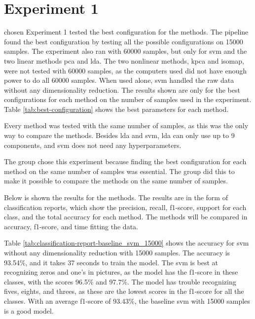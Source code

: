 \section{Experiment 1}\label{sec:experiment-1}chosen
Experiment 1 tested the best configuration for the methods. The pipeline found the best configuration by testing all the possible configurations on 15000 samples. The experiment also ran with 60000 samples, but only for \gls{svm} and the two linear methods \gls{pca} and \gls{lda}. The two nonlinear methods, \gls{kpca} and \gls{isomap}, were not tested with 60000 samples, as the computers used did not have enough power to do all 60000 samples. When used alone, \gls{svm} handled the raw data without any dimensionality reduction. The results shown are only for the best configurations for each method on the number of samples used in the experiment. Table \ref{tab:best-configuration} shows the best parameters for each method.



Every method was tested with the same number of samples, as this was the only way to compare the methods. Besides \gls{lda} and \gls{svm}, \gls{lda} can only use up to 9 components, and \gls{svm} does not need any hyperparameters.

The group chose this experiment because finding the best configuration for each method on the same number of samples was essential. The group did this to make it possible to compare the methods on the same number of samples. 

Below is shown the results for the methods. The results are in the form of classification reports, which show the precision, recall, f1-score, support for each class, and the total accuracy for each method. The methods will be compared in accuracy, f1-score, and time fitting the data. 

Table \ref{tab:classification-report-baseline_svm_15000} shows the accuracy for \gls{svm} without any dimensionality reduction with 15000 samples. The accuracy is 93.54\%, and it takes 37 seconds to train the model. The \gls{svm} is best at recognizing zeros and one's in pictures, as the model has the f1-score in these classes, with the scores 96.5\% and 97.7\%. The model has trouble recognizing fives, eights, and threes, as these are the lowest scores in the f1-score for all the classes. With an average f1-score of 93.43\%, the baseline \gls{svm} with 15000 samples is a good model. 

